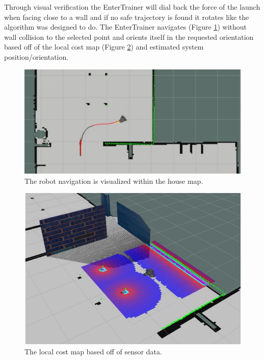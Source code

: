 \documentclass[11pt]{article}
\begin{document}
Through visual verification the EnterTrainer will dial back the force of the launch when facing close to a wall and if no safe trajectory is found it rotates like the algorithm was designed to do.  
The EnterTrainer navigates (Figure \ref{Navigation}) without wall collision to the selected point and orients itself in the requested orientation based off of the local cost map (Figure \ref{Cost Map}) and estimated system position/orientation.  

\begin{figure}[H]
    \centering
        \includegraphics[scale=.4, angle =0]{figures/navigation.JPG}
    \caption{The robot navigation is visualized within the house map.  }
    \label{Navigation}
\end{figure}

\begin{figure}[H]
    \centering
        \includegraphics[scale=.4, angle =0]{figures/costmap.JPG}
    \caption{The local cost map based off of sensor data. }
    \label{Cost Map}
\end{figure}
\end{document}
